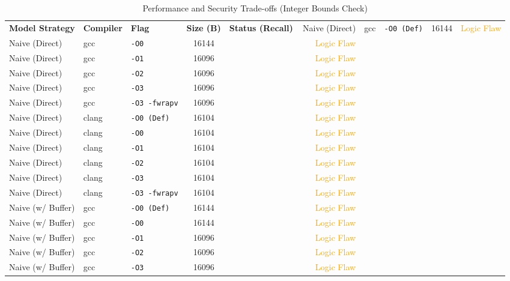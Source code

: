 
\begin{table}[htbp]
\centering
\caption{Performance and Security Trade-offs (Integer Bounds Check)}
\begin{tabular}{@{}lllcrl@{}}
\toprule
\textbf{Model Strategy} & \textbf{Compiler} & \textbf{Flag} & \textbf{Size (B)} & \textbf{Status (Recall)} \
\midrule
Naive (Direct) & gcc & \texttt{-O0 (Def)} & 16144 & \textcolor{orange}{Logic Flaw} \\
Naive (Direct) & gcc & \texttt{-O0} & 16144 & \textcolor{orange}{Logic Flaw} \\
Naive (Direct) & gcc & \texttt{-O1} & 16096 & \textcolor{orange}{Logic Flaw} \\
Naive (Direct) & gcc & \texttt{-O2} & 16096 & \textcolor{orange}{Logic Flaw} \\
Naive (Direct) & gcc & \texttt{-O3} & 16096 & \textcolor{orange}{Logic Flaw} \\
Naive (Direct) & gcc & \texttt{-O3 -fwrapv} & 16096 & \textcolor{orange}{Logic Flaw} \\
Naive (Direct) & clang & \texttt{-O0 (Def)} & 16104 & \textcolor{orange}{Logic Flaw} \\
Naive (Direct) & clang & \texttt{-O0} & 16104 & \textcolor{orange}{Logic Flaw} \\
Naive (Direct) & clang & \texttt{-O1} & 16104 & \textcolor{orange}{Logic Flaw} \\
Naive (Direct) & clang & \texttt{-O2} & 16104 & \textcolor{orange}{Logic Flaw} \\
Naive (Direct) & clang & \texttt{-O3} & 16104 & \textcolor{orange}{Logic Flaw} \\
Naive (Direct) & clang & \texttt{-O3 -fwrapv} & 16104 & \textcolor{orange}{Logic Flaw} \\
\midrule
Naive (w/ Buffer) & gcc & \texttt{-O0 (Def)} & 16144 & \textcolor{orange}{Logic Flaw} \\
Naive (w/ Buffer) & gcc & \texttt{-O0} & 16144 & \textcolor{orange}{Logic Flaw} \\
Naive (w/ Buffer) & gcc & \texttt{-O1} & 16096 & \textcolor{orange}{Logic Flaw} \\
Naive (w/ Buffer) & gcc & \texttt{-O2} & 16096 & \textcolor{orange}{Logic Flaw} \\
Naive (w/ Buffer) & gcc & \texttt{-O3} & 16096 & \textcolor{orange}{Logic Flaw} \\

\end{tabular}
\end{table}
